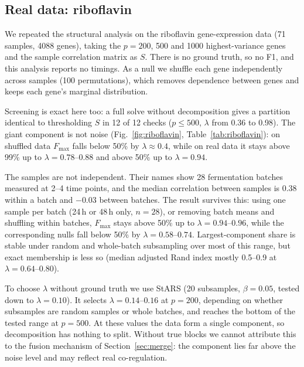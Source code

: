 \documentclass[conference]{IEEEtran}
\begin{document}
\subsection{Real data: riboflavin}
\label{sec:riboflavin}
We repeated the structural analysis on the riboflavin gene-expression data
\cite{buhlmann2014riboflavin} (71 samples, 4088 genes), taking the $p=200$,
500 and 1000 highest-variance genes and the sample correlation matrix as $S$.
There is no ground truth, so no F1, and this analysis reports no timings. As a
null we shuffle each gene independently across samples (100 permutations),
which removes dependence between genes and keeps each gene's marginal
distribution.

Screening is exact here too: a full solve without decomposition gives a
partition identical to thresholding $S$ in 12 of 12 checks ($p\le500$,
$\lambda$ from 0.36 to 0.98). The giant component is not noise
(Fig.~\ref{fig:riboflavin}, Table~\ref{tab:riboflavin}): on shuffled data
$F_{\max}$ falls below 50\% by $\lambda\approx0.4$, while on real data it stays
above 99\% up to $\lambda=0.78$--$0.88$ and above 50\% up to $\lambda=0.94$.

The samples are not independent. Their names show 28 fermentation batches
measured at 2--4 time points, and the median correlation between samples is
0.38 within a batch and $-0.03$ between batches. The result survives this:
using one sample per batch (24\,h or 48\,h only, $n=28$), or removing batch
means and shuffling within batches, $F_{\max}$ stays above 50\% up to
$\lambda=0.94$--$0.96$, while the corresponding nulls fall below 50\% by
$\lambda=0.58$--$0.74$. Largest-component share is stable under random and
whole-batch subsampling over most of this range, but exact membership is less
so (median adjusted Rand index mostly 0.5--0.9 at $\lambda=0.64$--$0.80$).

To choose $\lambda$ without ground truth we use StARS \cite{liu2010stars}
(20 subsamples, $\beta=0.05$, tested down to $\lambda=0.10$). It selects
$\lambda=0.14$--$0.16$ at $p=200$, depending on whether subsamples are random
samples or whole batches, and reaches the bottom of the tested range at
$p=500$. At these values the data form a single component, so decomposition has
nothing to split. Without true blocks we cannot attribute this to the fusion
mechanism of Section~\ref{sec:merge}: the component lies far above the noise
level and may reflect real co-regulation.
\end{document}
